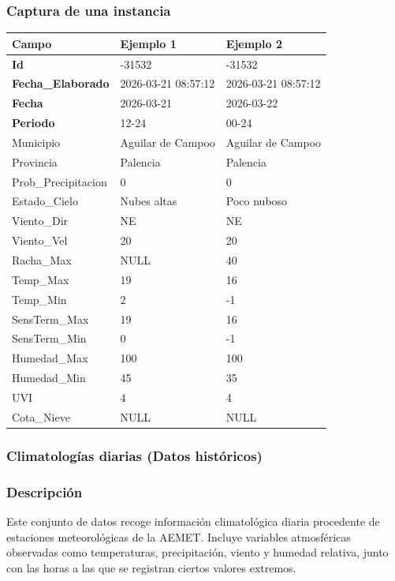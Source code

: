 \documentclass[12pt, a4paper]{article}
\begin{document}
\subsubsection*{Captura de una instancia}
\begin{center}
\begin{tabular}{|p{}|p{}|p{}|}
\hline
\textbf{Campo} & \textbf{Ejemplo 1} & \textbf{Ejemplo 2} \\
\hline
\textbf{Id} & -31532 & -31532 \\
\textbf{Fecha\_Elaborado} & 2026-03-21 08:57:12 & 2026-03-21 08:57:12 \\
\textbf{Fecha} & 2026-03-21 & 2026-03-22 \\
\textbf{Periodo} & 12-24 & 00-24 \\
Municipio & Aguilar de Campoo & Aguilar de Campoo \\
Provincia & Palencia & Palencia \\
Prob\_Precipitacion & 0 & 0 \\
Estado\_Cielo & Nubes altas & Poco nuboso \\
Viento\_Dir & NE & NE \\
Viento\_Vel & 20 & 20 \\
Racha\_Max & NULL & 40 \\
Temp\_Max & 19 & 16 \\
Temp\_Min & 2 & -1 \\
SensTerm\_Max & 19 & 16 \\
SensTerm\_Min & 0 & -1 \\
Humedad\_Max & 100 & 100 \\
Humedad\_Min & 45 & 35 \\
UVI & 4 & 4 \\
Cota\_Nieve & NULL & NULL \\
\hline
\end{tabular}
\end{center}

\subsubsection{Climatologías diarias (Datos históricos)}

\subsubsection*{Descripción}
Este conjunto de datos recoge información climatológica diaria procedente de estaciones meteorológicas de la AEMET. 
Incluye variables atmosféricas observadas como temperaturas, precipitación, viento y humedad relativa, junto con las horas a las que se registran ciertos valores extremos.
\end{document}
